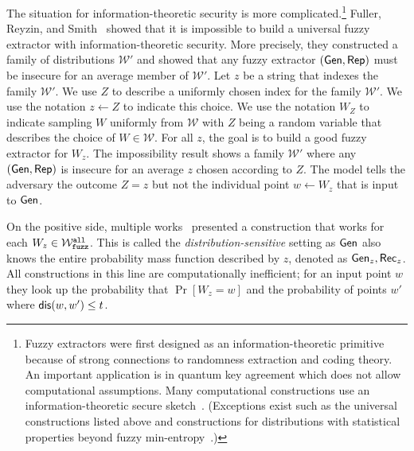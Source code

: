 The situation for information-theoretic security is more
complicated.\footnote{Fuzzy extractors were first designed as an
  information-theoretic primitive because of strong connections to
  randomness extraction and coding theory.  An important application is in quantum key agreement which does not allow computational assumptions.  Many computational
  constructions use an information-theoretic secure
  sketch~\cite{wen2018robustly,wen2019generic}.  (Exceptions exist
  such as the universal constructions listed above and constructions
  for distributions with statistical properties beyond fuzzy min-entropy~\cite{apon2017efficient,alamelou2018pseudoentropic,fuller2020computational,canetti2021reusable}.)
}  Fuller, Reyzin, and Smith~\cite{fuller2020fuzzy} showed that it is
impossible to build a universal fuzzy extractor with
information-theoretic security.  More precisely, they constructed a
family of distributions $\mathcal{W}'$ and showed that any
fuzzy extractor $({\mathsf{Gen}}, {\mathsf{Rep}})$ must be insecure for an average member
of $\mathcal{W}'$. Let $z$ be a string that indexes the family $\mathcal{W}'$. We use $Z$ to describe a uniformly chosen index for
the family $\mathcal{W'}$.  We use the notation $z\leftarrow Z$ to indicate this choice. We use the notation $W_Z$ to indicate sampling $W$ uniformly from $\mathcal{W}$ with $Z$ being a random variable that describes the choice of $W\in\mathcal{W}$. For all $z$, the goal is to build a good fuzzy extractor for $W_z$.  The impossibility result shows a family $\mathcal{W}'$ where any $({\mathsf{Gen}}, {\mathsf{Rep}})$ is insecure for an average $z$ chosen according to $Z$.  The model tells the adversary the outcome $Z=z$ but not the
individual point $w\leftarrow W_z$ that is input to ${\mathsf{Gen}}$.

On the positive side, multiple works~\cite{hayashi2014secret,hayashi2016secret,fuller2016fuzzy,woodage2017new,tyagi2017universal,TVW18,LA18,fuller2019continuous,fuller2020fuzzy} presented a construction that works for each $W_z\in \mathcal{W}_{\mathtt{fuzz}}^{\mathtt{all}}$.  This is called the \emph{distribution-sensitive} setting as ${\mathsf{Gen}}$ also knows the entire probability mass function described by $z$, denoted as ${\mathsf{Gen}}_{z}, {\mathsf{Rec}}_{z}$.  All constructions in this line are computationally inefficient; for an input point $w$ they look up the probability that $\Pr[W_z=w]$ and the probability of points $w'$ where $\mathsf{dis}(w, w')\le t$.  

